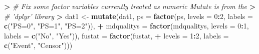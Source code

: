 \documentclass[
]{book}
\newenvironment{Shaded}{\begin{snugshade}}{\end{snugshade}}
\newcommand{\CommentTok}[1]{\textcolor[rgb]{0.56,0.35,0.01}{\textit{#1}}}
\newcommand{\ControlFlowTok}[1]{\textcolor[rgb]{0.13,0.29,0.53}{\textbf{#1}}}
\newcommand{\DataTypeTok}[1]{\textcolor[rgb]{0.13,0.29,0.53}{#1}}
\newcommand{\DecValTok}[1]{\textcolor[rgb]{0.00,0.00,0.81}{#1}}
\newcommand{\ErrorTok}[1]{\textcolor[rgb]{0.64,0.00,0.00}{\textbf{#1}}}
\newcommand{\KeywordTok}[1]{\textcolor[rgb]{0.13,0.29,0.53}{\textbf{#1}}}
\newcommand{\NormalTok}[1]{#1}
\newcommand{\OperatorTok}[1]{\textcolor[rgb]{0.81,0.36,0.00}{\textbf{#1}}}
\newcommand{\StringTok}[1]{\textcolor[rgb]{0.31,0.60,0.02}{#1}}
\begin{document}
\begin{Shaded}
\end{Shaded}

\begin{Shaded}
\begin{Highlighting}[]
\OperatorTok{>}\StringTok{ }\CommentTok{# Fix some factor variables currently treated as numeric Mutate is from the}
\ErrorTok{>}\StringTok{ }\CommentTok{# 'dplyr' library}
\ErrorTok{>}\StringTok{ }\NormalTok{dat1 <-}\StringTok{ }\KeywordTok{mutate}\NormalTok{(dat1, }\DataTypeTok{ps =} \KeywordTok{factor}\NormalTok{(ps, }\DataTypeTok{levels =} \DecValTok{0}\OperatorTok{:}\DecValTok{2}\NormalTok{, }\DataTypeTok{labels =} \KeywordTok{c}\NormalTok{(}\StringTok{"PS=0"}\NormalTok{, }\StringTok{"PS=1"}\NormalTok{, }\StringTok{"PS=2"}\NormalTok{)), }
\OperatorTok{+}\StringTok{     }\DataTypeTok{mdqualitys =} \KeywordTok{factor}\NormalTok{(mdqualitys, }\DataTypeTok{levels =} \DecValTok{0}\OperatorTok{:}\DecValTok{1}\NormalTok{, }\DataTypeTok{labels =} \KeywordTok{c}\NormalTok{(}\StringTok{"No"}\NormalTok{, }\StringTok{"Yes"}\NormalTok{)), }\DataTypeTok{fustat =} \KeywordTok{factor}\NormalTok{(fustat, }
\OperatorTok{+}\StringTok{         }\DataTypeTok{levels =} \DecValTok{1}\OperatorTok{:}\DecValTok{2}\NormalTok{, }\DataTypeTok{labels =} \KeywordTok{c}\NormalTok{(}\StringTok{"Event"}\NormalTok{, }\StringTok{"Censor"}\NormalTok{)))}
\end{Highlighting}
\end{Shaded}
\end{document}
